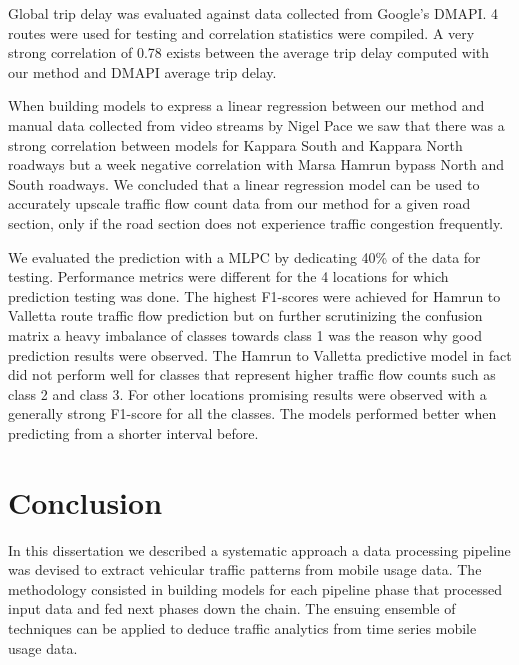 \documentclass[12pt, a4paper]{report}
\theoremstyle{definition}
\theoremstyle{definition}%
\theoremstyle{definition}%
\theoremstyle{definition}%
\theoremstyle{definition}%
\theoremstyle{definition}%
\begin{document}
Global trip delay was evaluated against data collected from Google's DMAPI. 4 routes were used for testing and correlation statistics were compiled. A very strong correlation of 0.78 exists between the average trip delay computed with our method and DMAPI average trip delay. 

When building models to express a linear regression between our method and manual data collected from video streams by Nigel Pace we saw that there was a strong correlation between models for Kappara South and Kappara North roadways but a week negative correlation with Marsa Hamrun bypass North and South roadways. We concluded that a linear regression model can be used to accurately upscale traffic flow count data from our method for a given road section, only if the road section does not experience traffic congestion frequently.

We evaluated the prediction with a MLPC by dedicating 40\% of the data for testing. Performance metrics were different for the 4 locations for which prediction testing was done. The highest F1-scores were achieved for Hamrun to Valletta route traffic flow prediction but on further scrutinizing the confusion matrix a heavy imbalance of classes towards class 1 was the reason why good prediction results were observed. The Hamrun to Valletta predictive model in fact did not perform well for classes that represent higher traffic flow counts such as class 2 and class 3. For other locations promising results were observed with a generally strong F1-score for all the classes. The models performed better when predicting from a shorter interval before. 



\chapter{Conclusion} \label{chapter:conclusion}

In this dissertation we described a systematic approach a data processing pipeline was devised to extract vehicular traffic patterns from mobile usage data. The methodology consisted in building models for each pipeline phase that processed input data and fed next phases down the chain. The ensuing ensemble of techniques can be applied to deduce traffic analytics from time series mobile usage data. 
\end{document}

